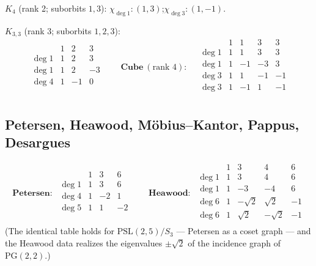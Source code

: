 \documentclass[11pt]{article}
\theoremstyle{remark}
\begin{document}
\textbf{$K_4$} (rank 2; suborbits $1,3$):\quad
$\chi_{\deg 1}: (1,3)$;\quad $\chi_{\deg 3}: (1,-1)$.

\medskip
\textbf{$K_{3,3}$} (rank 3; suborbits $1,2,3$):
\[
\begin{array}{l|rrr}
 & 1 & 2 & 3\\
\hline
\deg 1 & 1 & 2 & 3\\
\deg 1 & 1 & 2 & -3\\
\deg 4 & 1 & -1 & 0\\
\end{array}
\qquad
\textbf{Cube}\ (\text{rank }4):\quad
\begin{array}{l|rrrr}
 & 1 & 1 & 3 & 3\\
\hline
\deg 1 & 1 & 1 & 3 & 3\\
\deg 1 & 1 & -1 & -3 & 3\\
\deg 3 & 1 & 1 & -1 & -1\\
\deg 3 & 1 & -1 & 1 & -1\\
\end{array}
\]

\subsection{Petersen, Heawood, M\"obius--Kantor, Pappus, Desargues}

\[
\textbf{Petersen}:\;
\begin{array}{l|rrr}
 & 1 & 3 & 6\\
\hline
\deg 1 & 1 & 3 & 6\\
\deg 4 & 1 & -2 & 1\\
\deg 5 & 1 & 1 & -2\\
\end{array}
\qquad
\textbf{Heawood}:\;
\begin{array}{l|rrrr}
 & 1 & 3 & 4 & 6\\
\hline
\deg 1 & 1 & 3 & 4 & 6\\
\deg 1 & 1 & -3 & -4 & 6\\
\deg 6 & 1 & -\sqrt2 & \sqrt2 & -1\\
\deg 6 & 1 & \sqrt2 & -\sqrt2 & -1\\
\end{array}
\]
(The identical table holds for $\mathrm{PSL}(2,5)/S_3$ --- Petersen as a
coset graph --- and the Heawood data realizes the eigenvalues
$\pm\sqrt2$ of the incidence graph of $\mathrm{PG}(2,2)$.)
\end{document}
